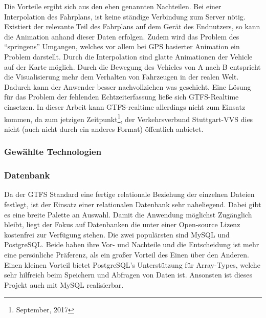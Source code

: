     Die Vorteile ergibt sich aus den eben genannten Nachteilen. Bei einer Interpolation des Fahrplans, ist keine ständige Verbindung zum Server nötig. Existiert der relevante Teil des Fahrplans auf dem Gerät des Endnutzers, so kann die Animation anhand dieser Daten erfolgen. Zudem wird das Problem des "`springens"' Umgangen, welches vor allem bei GPS basierter Animation ein Problem darstellt. Durch die Interpolation sind glatte Animationen der Vehicle auf der Karte möglich. Durch die Bewegung des Vehicles von A nach B entspricht die Visualisierung mehr dem Verhalten von Fahrzeugen in der realen Welt. Dadurch kann der Anwender besser nachvollziehen was geschieht.
    Eine Lösung für das Problem der fehlenden Echtzeiterfassung ließe sich GTFS-Realtime einsetzen. In dieser Arbeit kann GTFS-realtime allerdings nicht zum Einsatz kommen, da zum jetzigen Zeitpunkt\footnote{September, 2017}, der Verkehrsverbund Stuttgart-VVS dies nicht (auch nicht durch ein anderes Format) öffentlich anbietet.
    

  \subsubsection{Gewählte Technologien}
  \label{ssub:gewählte_technologien}
    
    \subsubsection*{Datenbank}
    \label{ssub:datenbank}
      Da der GTFS Standard eine fertige relationale Beziehung der einzelnen Dateien festlegt, ist der Einsatz einer relationalen Datenbank sehr naheliegend. Dabei gibt es eine breite Palette an Auswahl. Damit die Anwendung möglichst Zugänglich bleibt, liegt der Fokus auf Datenbanken die unter einer Open-source Lizenz kostenfrei zur Verfügung stehen. Die zwei populärsten sind MySQL und PostgreSQL\parencite{db_engines}. Beide haben ihre Vor- und Nachteile und die Entscheidung ist mehr eine persönliche Präferenz, als ein großer Vorteil des Einen über den Anderen. Einen kleinen Vorteil bietet PostgreSQL's Unterstützung für Array-Types, welche sehr hilfreich beim Speichern und Abfragen von Daten ist. Ansonsten ist dieses Projekt auch mit MySQL realisierbar.

